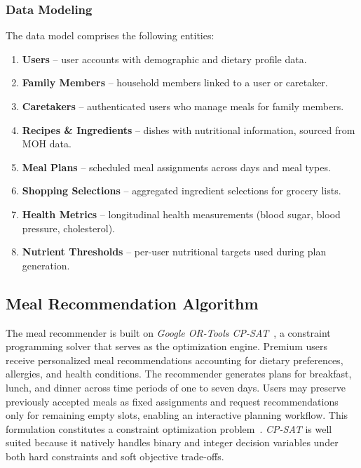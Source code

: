 \documentclass[conference]{IEEEtran}
\begin{document}
\subsubsection{Data Modeling}
The data model comprises the following entities:
\begin{enumerate}
    \item \textbf{Users} -- user accounts with demographic and dietary profile data.
    \item \textbf{Family Members} -- household members linked to a user or caretaker.
    \item \textbf{Caretakers} -- authenticated users who manage meals for family members.
    \item \textbf{Recipes \& Ingredients} -- dishes with nutritional information, sourced from MOH data.
    \item \textbf{Meal Plans} -- scheduled meal assignments across days and meal types.
    \item \textbf{Shopping Selections} -- aggregated ingredient selections for grocery lists.
    \item \textbf{Health Metrics} -- longitudinal health measurements (blood sugar, blood pressure, cholesterol).
    \item \textbf{Nutrient Thresholds} -- per-user nutritional targets used during plan generation.
\end{enumerate}


\subsection{Meal Recommendation Algorithm}

The meal recommender is built on \textit{Google OR-Tools CP-SAT}~\cite{b7}, a constraint programming solver that serves as the optimization engine. Premium users receive personalized meal recommendations accounting for dietary preferences, allergies, and health conditions. The recommender generates plans for breakfast, lunch, and dinner across time periods of one to seven days. Users may preserve previously accepted meals as fixed assignments and request recommendations only for remaining empty slots, enabling an interactive planning workflow. This formulation constitutes a constraint optimization problem~\cite{b6}. \textit{CP-SAT} is well suited because it natively handles binary and integer decision variables under both hard constraints and soft objective trade-offs.
\end{document}
